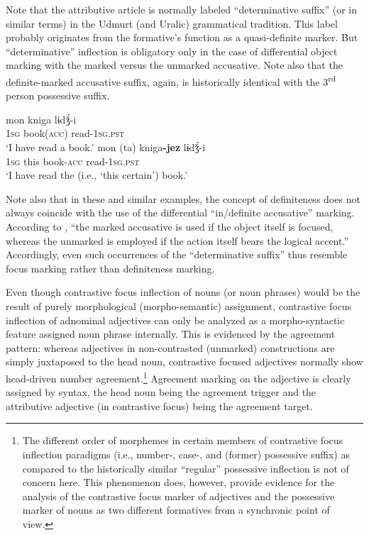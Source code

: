Note that the attributive article is normally labeled “determinative suffix” (or in similar terms) in the Udmurt (and Uralic) grammatical tradition. This label probably originates from the formative's function as a quasi-definite marker. But “determinative” inflection is obligatory only in the case of differential object marking with the marked versus the unmarked accusative. Note also that the definite-marked accusative suffix, again, is historically identical with the 3\textsuperscript{rd} person possessive suffix.
\begin{exe}
\begin{xlist}
\ex
\gll	mon kniga lɨdǯ́-i\\
	\textsc{1sg} book(\textsc{acc}) read-\textsc{1sg.pst}\\
\glt	‘I have read a book.’
\ex	
\gll	mon (ta) kniga\textbf{-jez} lɨdǯ́-i\\
	\textsc{1sg} this book-\textsc{acc} read-\textsc{1sg.pst}\\
\glt	‘I have read the (i.e., ‘this certain’) book.’
\end{xlist}
\end{exe}
Note also that in these and similar examples, the concept of definiteness does not always coincide with the use of the differential “in\slash{}definite accusative” marking. According to \citet[21]{winkler2001}, “the marked accusative is used if the object itself is focused, whereas the unmarked is employed if the action itself bears the logical accent.” Accordingly, even such occurrences of the “determinative suffix” thus resemble focus marking rather than definiteness marking.

Even though contrastive focus inflection of nouns (or noun phrases) would be the result of purely morphological (morpho-semantic) assignment, contrastive focus inflection of adnominal adjectives can only be analyzed as a morpho-syntactic feature assigned noun phrase internally. This is evidenced by the agreement pattern: whereas adjectives in non-contrasted (unmarked) constructions are simply juxtaposed to the head noun, contrastive focused adjectives normally show head\hyp{}driven number agreement.\footnote{The different order of morphemes in certain members of contrastive focus inflection paradigms (i.e., number-, case-, and (former) possessive suffix) as compared to the historically similar “regular” possessive inflection \citep[32]{winkler2001} is not of concern here. This phenomenon does, however, provide evidence for the analysis of the contrastive focus marker of adjectives and the possessive marker of nouns as two different formatives from a synchronic point of view.} Agreement marking on the adjective is clearly assigned by syntax, the head noun being the agreement trigger and the attributive adjective (in contrastive focus) being the agreement target.

